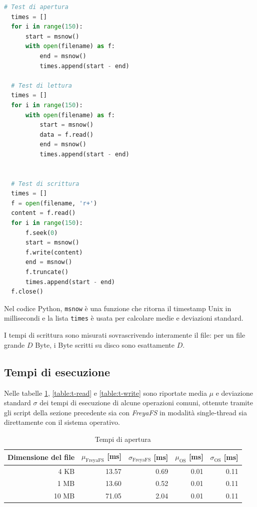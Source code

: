 \documentclass[a4paper,12pt,twoside,openright]{report}
\begin{document}
  \begin{lstlisting}[language=Python]
  # Test di apertura
  times = []
  for i in range(150):
      start = msnow()
      with open(filename) as f:
          end = msnow()
          times.append(start - end)

  # Test di lettura
  times = []
  for i in range(150):
      with open(filename) as f:
          start = msnow()
          data = f.read()
          end = msnow()
          times.append(start - end)


  # Test di scrittura
  times = []
  f = open(filename, 'r+')
  content = f.read()
  for i in range(150):
      f.seek(0)
      start = msnow()
      f.write(content)
      end = msnow()
      f.truncate()
      times.append(start - end)
  f.close()
  \end{lstlisting}

  Nel codice Python, \texttt{msnow} è una funzione che ritorna il timestamp Unix in millisecondi
  e la lista \texttt{times} è usata per calcolare medie e deviazioni standard.

  I tempi di scrittura sono misurati sovrascrivendo interamente il file: per un file grande $D$ Byte,
  i Byte scritti su disco sono esattamente $D$.

  \subsection{Tempi di esecuzione}

  Nelle tabelle \ref{table:t-open}, \ref{table:t-read} e \ref{table:t-write} sono riportate
  media $\mu$ e deviazione standard $\sigma$ dei tempi di esecuzione di alcune operazioni comuni,
  ottenute tramite gli script della sezione precedente sia con \textit{FreyaFS} in modalità single-thread
  sia direttamente con il sistema operativo.

  \begin{table}[h!]
    \centering
    \begin{tabular}{|r||r|r||r|r|} 
      \hline
      Dimensione del file & $\mu_\text{FreyaFS}$ [ms] & $\sigma_\text{FreyaFS}$ [ms] & $\mu_\text{OS}$ [ms] & $\sigma_\text{OS}$ [ms] \\ [0.5ex]
      \hline\hline
      4 KB & 13.57 & 0.69  & 0.01 & 0.11 \\
      \hline
       1 MB & 13.60 & 0.52 & 0.01 & 0.11 \\
      \hline
      10 MB & 71.05 & 2.04 & 0.01 & 0.11 \\
      \hline
    \end{tabular}
    \caption{Tempi di apertura}
    \label{table:t-open}
  \end{table}
\end{document}
